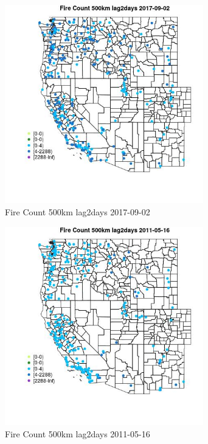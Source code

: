 \begin{figure} 
\centering  
\includegraphics[width=0.77\textwidth]{Code_Outputs/Report_ML_input_PM25_Step4_part_e_de_duplicated_aves_compiled_2019-05-21wNAs_MapObsFire_Count_500km_lag2days2017-09-02.jpg} 
\caption{\label{fig:Report_ML_input_PM25_Step4_part_e_de_duplicated_aves_compiled_2019-05-21wNAsMapObsFire_Count_500km_lag2days2017-09-02}Fire Count 500km lag2days 2017-09-02} 
\end{figure} 
 

\begin{figure} 
\centering  
\includegraphics[width=0.77\textwidth]{Code_Outputs/Report_ML_input_PM25_Step4_part_e_de_duplicated_aves_compiled_2019-05-21wNAs_MapObsFire_Count_500km_lag2days2011-05-16.jpg} 
\caption{\label{fig:Report_ML_input_PM25_Step4_part_e_de_duplicated_aves_compiled_2019-05-21wNAsMapObsFire_Count_500km_lag2days2011-05-16}Fire Count 500km lag2days 2011-05-16} 
\end{figure} 
 


